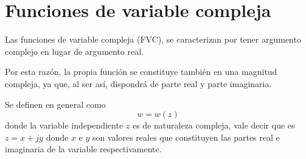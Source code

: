 \section{Funciones de variable compleja}

Las funciones de variable compleja (FVC), se caracterizan por tener argumento complejo en lugar de argumento real.

Por esta razón, la propia función se constituye también en una magnitud compleja, ya que, al ser así, dispondrá de parte real y parte imaginaria.

Se definen en general como
$$
w=w(z)
$$
donde la variable independiente $z$ es de naturaleza compleja, vale decir que es $z=x+jy$ donde $x$ e $y$ son valores reales que constituyen las partes real e imaginaria de la variable respectivamente.
